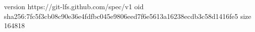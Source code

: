 version https://git-lfs.github.com/spec/v1
oid sha256:7fc5f3cb08c90e36e4fdfbc045e9806eed7f6e5613a16238ecdb3c58d1416fe5
size 164818
